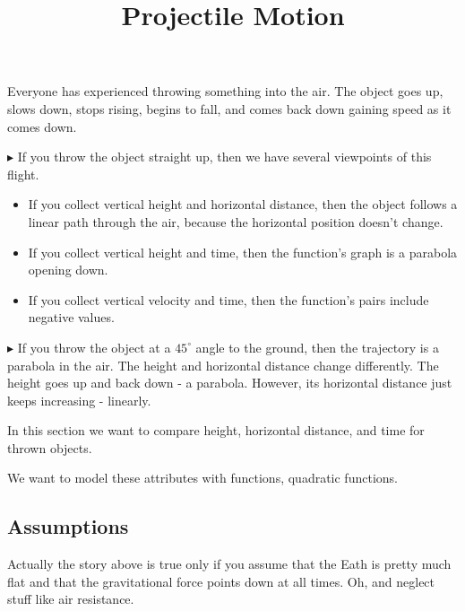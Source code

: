 \documentclass{ximera}
\title{Projectile Motion}
\begin{document}
\begin{abstract}
\end{abstract}
\maketitle



Everyone has experienced throwing something into the air. The object goes up, slows down, stops rising, begins to fall, and comes back down gaining speed as it comes down.  





$\blacktriangleright$ If you throw the object straight up, then we have several viewpoints of this flight. 

\begin{itemize}
\item If you collect vertical height and horizontal distance, then the object follows a linear path through the air, because the horizontal position doesn't change.  
\item If you collect vertical height and time, then the function's graph is a parabola opening down.
\item If you collect vertical velocity and time, then the function's pairs include negative values.
\end{itemize}




$\blacktriangleright$  If you throw the object at a $45^{\circ}$ angle to the ground, then the trajectory is a parabola in the air.  The height and horizontal distance change differently.  The height goes up and back down - a parabola.  However, its horizontal distance just keeps increasing - linearly. 


In this section we want to compare height, horizontal distance, and time for thrown objects. 

We want to model these attributes with functions, quadratic functions.



\subsection*{Assumptions}

Actually the story above is true only if you assume that the Eath is pretty much flat and that the gravitational force points down at all times. Oh, and neglect stuff like air resistance.
\end{document}
